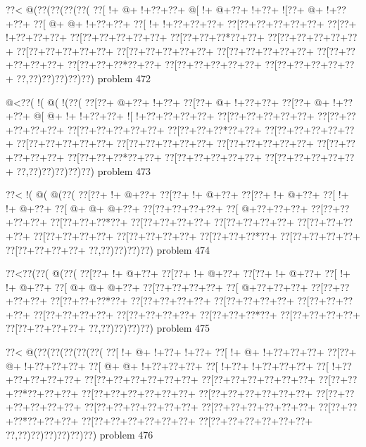 \vbox{\vbox{\goo
\0??<\- @(\0??(\0??(\0??(\0??(
\0??[\- !+\- @+\- !+\0??+\0??+
\- @[\- !+\- @+\0??+\- !+\0??+
\- ![\0??+\- @+\- !+\0??+\0??+
\0??[\- @+\- @+\- !+\0??+\0??+
\0??[\- !+\- !+\0??+\0??+\0??+
\0??[\0??+\0??+\0??+\0??+\0??+
\0??[\0??+\- !+\0??+\0??+\0??+
\0??[\0??+\0??+\0??+\0??+\0??+
\0??[\0??+\0??+\0??*\0??+\0??+
\0??[\0??+\0??+\0??+\0??+\0??+
\0??[\0??+\0??+\0??+\0??+\0??+
\0??[\0??+\0??+\0??+\0??+\0??+
\0??[\0??+\0??+\0??+\0??+\0??+
\0??[\0??+\0??+\0??+\0??+\0??+
\0??[\0??+\0??+\0??*\0??+\0??+
\0??[\0??+\0??+\0??+\0??+\0??+
\0??[\0??+\0??+\0??+\0??+\0??+
\0??,\0??)\0??)\0??)\0??)\0??)
}
\hfil problem 472\hfil\break
}

\vbox{\vbox{\goo
\- @<\0??(\- !(\- @(\- !(\0??(
\0??[\0??+\- @+\0??+\- !+\0??+
\0??[\0??+\- @+\- !+\0??+\0??+
\0??[\0??+\- @+\- !+\0??+\0??+
\- @[\- @+\- !+\- !+\0??+\0??+
\- ![\- !+\0??+\0??+\0??+\0??+
\0??[\0??+\0??+\0??+\0??+\0??+
\0??[\0??+\0??+\0??+\0??+\0??+
\0??[\0??+\0??+\0??+\0??+\0??+
\0??[\0??+\0??+\0??*\0??+\0??+
\0??[\0??+\0??+\0??+\0??+\0??+
\0??[\0??+\0??+\0??+\0??+\0??+
\0??[\0??+\0??+\0??+\0??+\0??+
\0??[\0??+\0??+\0??+\0??+\0??+
\0??[\0??+\0??+\0??+\0??+\0??+
\0??[\0??+\0??+\0??*\0??+\0??+
\0??[\0??+\0??+\0??+\0??+\0??+
\0??[\0??+\0??+\0??+\0??+\0??+
\0??,\0??)\0??)\0??)\0??)\0??)
}
\hfil problem 473\hfil\break
}

\vbox{\vbox{\goo
\0??<\- !(\- @(\- @(\0??(
\0??[\0??+\- !+\- @+\0??+
\0??[\0??+\- !+\- @+\0??+
\0??[\0??+\- !+\- @+\0??+
\0??[\- !+\- !+\- @+\0??+
\0??[\- @+\- @+\- @+\0??+
\0??[\0??+\0??+\0??+\0??+
\0??[\- @+\0??+\0??+\0??+
\0??[\0??+\0??+\0??+\0??+
\0??[\0??+\0??+\0??*\0??+
\0??[\0??+\0??+\0??+\0??+
\0??[\0??+\0??+\0??+\0??+
\0??[\0??+\0??+\0??+\0??+
\0??[\0??+\0??+\0??+\0??+
\0??[\0??+\0??+\0??+\0??+
\0??[\0??+\0??+\0??*\0??+
\0??[\0??+\0??+\0??+\0??+
\0??[\0??+\0??+\0??+\0??+
\0??,\0??)\0??)\0??)\0??)
}
\hfil problem 474\hfil\break
}

\vbox{\vbox{\goo
\0??<\0??(\0??(\- @(\0??(
\0??[\0??+\- !+\- @+\0??+
\0??[\0??+\- !+\- @+\0??+
\0??[\0??+\- !+\- @+\0??+
\0??[\- !+\- !+\- @+\0??+
\0??[\- @+\- @+\- @+\0??+
\0??[\0??+\0??+\0??+\0??+
\0??[\- @+\0??+\0??+\0??+
\0??[\0??+\0??+\0??+\0??+
\0??[\0??+\0??+\0??*\0??+
\0??[\0??+\0??+\0??+\0??+
\0??[\0??+\0??+\0??+\0??+
\0??[\0??+\0??+\0??+\0??+
\0??[\0??+\0??+\0??+\0??+
\0??[\0??+\0??+\0??+\0??+
\0??[\0??+\0??+\0??*\0??+
\0??[\0??+\0??+\0??+\0??+
\0??[\0??+\0??+\0??+\0??+
\0??,\0??)\0??)\0??)\0??)
}
\hfil problem 475\hfil\break
}

\vbox{\vbox{\goo
\0??<\- @(\0??(\0??(\0??(\0??(\0??(
\0??[\- !+\- @+\- !+\0??+\- !+\0??+
\0??[\- !+\- @+\- !+\0??+\0??+\0??+
\0??[\0??+\- @+\- !+\0??+\0??+\0??+
\0??[\- @+\- @+\- !+\0??+\0??+\0??+
\0??[\- !+\0??+\- !+\0??+\0??+\0??+
\0??[\- !+\0??+\0??+\0??+\0??+\0??+
\0??[\0??+\0??+\0??+\0??+\0??+\0??+
\0??[\0??+\0??+\0??+\0??+\0??+\0??+
\0??[\0??+\0??+\0??*\0??+\0??+\0??+
\0??[\0??+\0??+\0??+\0??+\0??+\0??+
\0??[\0??+\0??+\0??+\0??+\0??+\0??+
\0??[\0??+\0??+\0??+\0??+\0??+\0??+
\0??[\0??+\0??+\0??+\0??+\0??+\0??+
\0??[\0??+\0??+\0??+\0??+\0??+\0??+
\0??[\0??+\0??+\0??*\0??+\0??+\0??+
\0??[\0??+\0??+\0??+\0??+\0??+\0??+
\0??[\0??+\0??+\0??+\0??+\0??+\0??+
\0??,\0??)\0??)\0??)\0??)\0??)\0??)
}
\hfil problem 476\hfil\break
}

